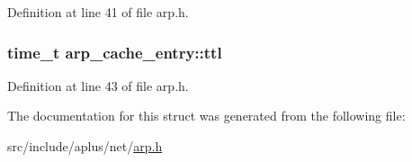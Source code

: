 Definition at line 41 of file arp.\+h.

\hypertarget{structarp__cache__entry_a9e7f6ce0108939a15edffff4aa0fdb5a}{
\subsubsection[{ttl}]{\setlength{\rightskip}{0pt plus 5cm}time\+\_\+t arp\+\_\+cache\+\_\+entry\+::ttl}}\label{structarp__cache__entry_a9e7f6ce0108939a15edffff4aa0fdb5a}


Definition at line 43 of file arp.\+h.



The documentation for this struct was generated from the following file\+:\begin{DoxyCompactItemize}
\item 
src/include/aplus/net/\hyperlink{arp_8h}{arp.\+h}\end{DoxyCompactItemize}
